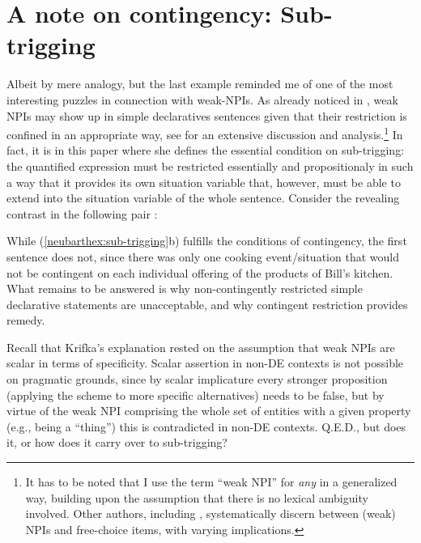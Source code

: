 \documentclass[output=paper,colorlinks,citecolor=brown,
]{langscibook}
\begin{document}
\section{A note on contingency: Sub-trigging}

Albeit by mere analogy, but the last example reminded me of one of the most interesting puzzles in connection with
weak-NPIs. As already noticed in \citet{legrand1975}, weak NPIs may show up in simple declaratives sentences given that
their restriction is confined in an appropriate way, see \citet{dayal1998} for an extensive discussion and
analysis.\footnote{It has to be noted that I use the term “weak NPI” for \textit{any} in a generalized way, building upon the assumption
that there is no lexical ambiguity involved. Other authors, including \citet{dayal1998}, systematically
discern between (weak) NPIs and free-choice items, with varying implications.} In fact, it is in this paper where she defines
the essential condition on sub-trigging: the quantified expression must be restricted essentially and propositionaly in such a way that it provides its own situation variable that,
however, must be able to extend into the situation variable of the whole sentence. Consider the revealing contrast in
the following pair \citep{dayal1998}:

\begin{exe}
  \ex\label{neubarthex:sub-trigging}
  \begin{xlist}
  \end{xlist}
\end{exe}

While (\ref{neubarthex:sub-trigging}b) fulfills the conditions of contingency, the first sentence does not,
since there was only one cooking event\slash situation that would not be contingent on each individual offering of the
products of Bill's kitchen. What remains to be answered is why non-contingently restricted simple declarative
statements are unacceptable, and why contingent restriction provides remedy.

Recall that Krifka's explanation rested on the assumption that weak NPIs are scalar in terms of specificity. Scalar
assertion in non-DE contexts is not possible on pragmatic grounds, since by scalar implicature every stronger
proposition (applying the scheme to more specific alternatives) needs to be false, but by virtue of the weak NPI
comprising the whole set of entities with a given property (e.g., being a “thing”) this is contradicted in non-DE
contexts. Q.E.D., but does it, or how does it carry over to sub-trigging?
\end{document}
